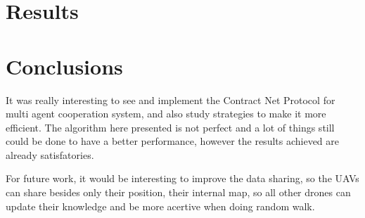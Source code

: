 \documentclass{article}
\begin{document}
\section{Results}


\section{Conclusions}
It was really interesting to see and implement the Contract Net Protocol for multi agent cooperation system, and also study strategies to make it more efficient. The algorithm here presented is not perfect and a lot of things still could be done to have a better performance, however the results achieved are already satisfatories.

For future work, it would be interesting to improve the data sharing, so the UAVs can share besides only their position, their internal map, so all other drones can update their knowledge and be more acertive when doing random walk.
\end{document}
